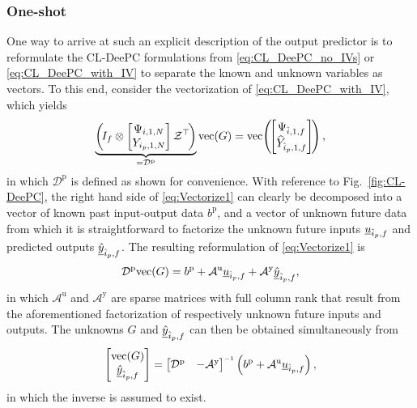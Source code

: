 \subsubsection{One-shot}
One way to arrive at such an explicit description of the output predictor is to reformulate the \ac{CL-DeePC} formulations from \eqref{eq:CL_DeePC_no_IVs} or \eqref{eq:CL_DeePC_with_IV} to separate the known and unknown variables as vectors. To this end, consider the vectorization of \eqref{eq:CL_DeePC_with_IV}, which yields
\begin{align}\label{eq:Vectorize1}
    \underbrace{\left(\mkern-3mu I_f \otimes \begin{bmatrix}
        \Psi_{i,1,N}\\
        Y_{i_p,1,N}
    \end{bmatrix}{\mathcal{Z}}^\top\mkern-3mu\right)}_{=\mathcal{D}^\mathrm{p}}\text{vec}(G)=\text{vec}\mkern-3mu\left(\mkern-3mu\begin{bmatrix}
        \Psi_{\hat{i},1,f}\\
        \widehat{Y}_{\hat{i}_p,1,f}
    \end{bmatrix}\mkern-3mu\right),
\end{align}%
in which $\mathcal{D}^\mathrm{p}$ is defined as shown for convenience. With reference to Fig.~\ref{fig:CL-DeePC}, the right hand side of \eqref{eq:Vectorize1} can clearly be decomposed into a vector of known past input-output data $b^\mathrm{p}$, and a vector of unknown future data from which it is straightforward to factorize the unknown future inputs $\underline{u}_{\hat{i}_p,f}$ and predicted outputs $\underline{\hat{y}}_{\hat{i}_p,f}$. The resulting reformulation of \eqref{eq:Vectorize1} is
\begin{align}
    \mathcal{D}^\mathrm{p}\text{vec}(G) = b^\mathrm{p}+\mathcal{A}^\mathrm{u}\underline{u}_{\hat{i}_p,f} + \mathcal{A}^\mathrm{y}\underline{\hat{y}}_{\hat{i}_p,f},
\end{align}
in which $\mathcal{A}^\mathrm{u}$ and $\mathcal{A}^\mathrm{y}$ are sparse matrices with full column rank that result from the aforementioned factorization of respectively unknown future inputs and outputs. The unknowns $G$ and $\underline{\hat{y}}_{\hat{i}_p,f}$ can then be obtained simultaneously from
\begin{align}
    \begin{bmatrix}
        \text{vec}(G)\\
        \datavec{\hat{y}}{\hat{i}_p,f}
    \end{bmatrix} =
    \begin{bmatrix}
        \mathcal{D}^\mathrm{p} & -\mathcal{A}^\mathrm{y}
    \end{bmatrix}\inv \left(b^\mathrm{p} + \mathcal{A}^\mathrm{u}\datavec{u}{\hat{i}_p,f}\right),
\end{align}
in which the inverse is assumed to exist.
%
